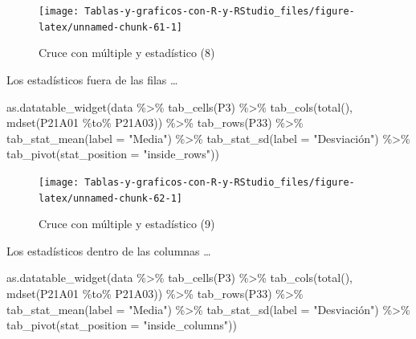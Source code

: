 \documentclass[
]{book}
\newenvironment{Shaded}{\begin{snugshade}}{\end{snugshade}}
\newcommand{\AttributeTok}[1]{\textcolor[rgb]{0.77,0.63,0.00}{#1}}
\newcommand{\FunctionTok}[1]{\textcolor[rgb]{0.00,0.00,0.00}{#1}}
\newcommand{\NormalTok}[1]{#1}
\newcommand{\SpecialCharTok}[1]{\textcolor[rgb]{0.00,0.00,0.00}{#1}}
\newcommand{\StringTok}[1]{\textcolor[rgb]{0.31,0.60,0.02}{#1}}
\begin{document}
\begin{figure}[H]

{\centering \texttt{[image: Tablas-y-graficos-con-R-y-RStudio\_files/figure-latex/unnamed-chunk-61-1]} 

}

\caption{Cruce con múltiple y estadístico (8)}\label{fig:unnamed-chunk-61}
\end{figure}

Los estadísticos fuera de las filas \ldots{}

\begin{Shaded}
\begin{Highlighting}[]
\FunctionTok{as.datatable\_widget}\NormalTok{(data }\SpecialCharTok{\%\textgreater{}\%}
  \FunctionTok{tab\_cells}\NormalTok{(P3) }\SpecialCharTok{\%\textgreater{}\%}
  \FunctionTok{tab\_cols}\NormalTok{(}\FunctionTok{total}\NormalTok{(), }\FunctionTok{mdset}\NormalTok{(P21A01 }\SpecialCharTok{\%to\%}\NormalTok{ P21A03)) }\SpecialCharTok{\%\textgreater{}\%}
  \FunctionTok{tab\_rows}\NormalTok{(P33) }\SpecialCharTok{\%\textgreater{}\%}
  \FunctionTok{tab\_stat\_mean}\NormalTok{(}\AttributeTok{label =} \StringTok{"Media"}\NormalTok{) }\SpecialCharTok{\%\textgreater{}\%}
  \FunctionTok{tab\_stat\_sd}\NormalTok{(}\AttributeTok{label =} \StringTok{"Desviación"}\NormalTok{) }\SpecialCharTok{\%\textgreater{}\%}
  \FunctionTok{tab\_pivot}\NormalTok{(}\AttributeTok{stat\_position =} \StringTok{"inside\_rows"}\NormalTok{))}
\end{Highlighting}
\end{Shaded}

\begin{figure}[H]

{\centering \texttt{[image: Tablas-y-graficos-con-R-y-RStudio\_files/figure-latex/unnamed-chunk-62-1]} 

}

\caption{Cruce con múltiple y estadístico (9)}\label{fig:unnamed-chunk-62}
\end{figure}

Los estadísticos dentro de las columnas \ldots{}

\begin{Shaded}
\begin{Highlighting}[]
\FunctionTok{as.datatable\_widget}\NormalTok{(data }\SpecialCharTok{\%\textgreater{}\%}
  \FunctionTok{tab\_cells}\NormalTok{(P3) }\SpecialCharTok{\%\textgreater{}\%}
  \FunctionTok{tab\_cols}\NormalTok{(}\FunctionTok{total}\NormalTok{(), }\FunctionTok{mdset}\NormalTok{(P21A01 }\SpecialCharTok{\%to\%}\NormalTok{ P21A03)) }\SpecialCharTok{\%\textgreater{}\%}
  \FunctionTok{tab\_rows}\NormalTok{(P33) }\SpecialCharTok{\%\textgreater{}\%}
  \FunctionTok{tab\_stat\_mean}\NormalTok{(}\AttributeTok{label =} \StringTok{"Media"}\NormalTok{) }\SpecialCharTok{\%\textgreater{}\%}
  \FunctionTok{tab\_stat\_sd}\NormalTok{(}\AttributeTok{label =} \StringTok{"Desviación"}\NormalTok{) }\SpecialCharTok{\%\textgreater{}\%}
  \FunctionTok{tab\_pivot}\NormalTok{(}\AttributeTok{stat\_position =} \StringTok{"inside\_columns"}\NormalTok{))}
\end{Highlighting}
\end{Shaded}
\end{document}
